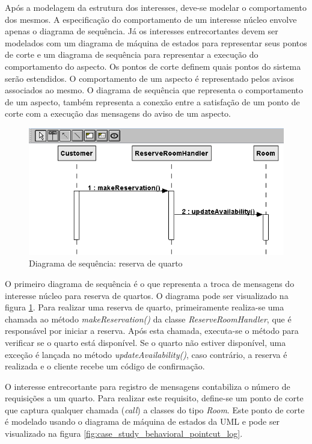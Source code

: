 Após a modelagem da estrutura dos interesses, deve-se modelar o comportamento dos mesmos. A especificação do comportamento de um interesse núcleo
envolve apenas o diagrama de sequência. Já os interesses entrecortantes devem ser modelados com um diagrama de máquina de estados para representar
seus pontos de corte e um diagrama de sequência para representar a execução do comportamento do aspecto. Os pontos de corte definem quais pontos do
sistema serão estendidos. O comportamento de um aspecto é representado pelos avisos associados ao mesmo. O diagrama de sequência que representa o
comportamento de um aspecto, também representa a conexão entre a satisfação de um ponto de corte com a execução das mensagens do aviso de um aspecto.

  \begin{figure}[!h]
	\centering
	\includegraphics[scale=0.8]{img/case_study_behavioral_reserve_room.png}
	\caption{Diagrama de sequência: reserva de quarto}\label{fig:case_study_behavioral_reserve_room}
  \end{figure}

O primeiro diagrama de sequência é o que representa a troca de mensagens do interesse núcleo para reserva de quartos. O diagrama pode ser visualizado
na figura \ref{fig:case_study_behavioral_reserve_room}. Para realizar uma reserva de quarto, primeiramente realiza-se uma chamada ao método
\textit{makeReservation()} da classe \textit{ReserveRoomHandler}, que é responsável por iniciar a reserva. Após esta chamada, executa-se o método
para verificar se o quarto está disponível. Se o quarto não estiver disponível, uma exceção é lançada no método \textit{updateAvailability()}, caso
contrário, a reserva é realizada e o cliente recebe um código de confirmação. 

O interesse entrecortante para registro de mensagens contabiliza o número de requisições a um quarto. Para realizar este requisito, define-se um ponto
de corte que captura qualquer chamada (\textit{call}) a classes do tipo \textit{Room}. Este ponto de corte é modelado usando o diagrama de máquina de
estados da UML e pode ser visualizado na figura \ref{fig:case_study_behavioral_pointcut_log}.

